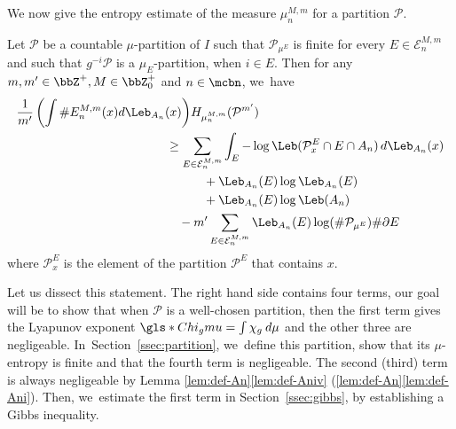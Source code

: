 We now give the entropy estimate of the measure $\mu_n^{M,m}$ for a partition $\mathcal{P}$.

\begin{prop}
\label{prop:entrop-estim}
Let $\mathcal{P}$ be a countable $\mu$-partition of $I$ such that $\mathcal{P}_{\mu^E}$ is finite for every $E \in \mathcal{E}_n^{M,m}$ and such that $g^{-i} \mathcal{P}$ is a $\mu_E$-partition, when $i \in E$.
Then for any $m,m' \in \bbZ^+, M \in \bbZ_0^+$ and $n \in \mcbn$, we~have
\begin{align*}
\frac{1}{m'} \left (\int \# E_n^{M,m}(x) d \Leb_{A_n}(x) \right) &H_{\mu_n^{M,m}}(\mathcal{P}^{m'})\\
&\hspace{-2em}\geq \sum_{E \in \mathcal{E}_n^{M,m}} \int_E - \log \Leb(\mathcal{P}_{x}^E \cap E \cap A_n) \,d \Leb_{A_n}(x)\\
&\hspace{1em}+ \Leb_{A_n}(E) \log \Leb_{A_n}(E)\\
&\hspace{1em}+ \Leb_{A_n}(E) \log \Leb(A_n)\\
&\hspace{-1em}- m' \sum_{E \in \mathcal{E}_n^{M,m}} \Leb_{A_n}(E) \log (\# \mathcal{P}_{\mu^E}) \# \partial E
\end{align*}
where $\mathcal{P}_x^E$ is the element of the partition $\mathcal{P}^E$ that contains $x$.
\end{prop}

Let us dissect this statement. The right hand side contains four terms, our goal will be to show that when $\mathcal{P}$ is a well-chosen partition, then the first term gives the Lyapunov exponent
$\gls*{Chi_gmu} = \int \chi_g \: d \mu$ and the other three are negligeable. In~Section~\ref{ssec:partition}, we~define this partition, show that its $\mu$-entropy is finite and that the fourth term is negligeable.
The second (\resp third) term is always negligeable by Lemma \ref{lem:def-An}\eqref{lem:def-Aniv} (\resp \ref{lem:def-An}\eqref{lem:def-Ani}).
Then, we~estimate the first term in Section~\ref{ssec:gibbs}, by establishing a Gibbs inequality.

